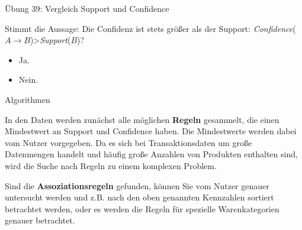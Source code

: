 \documentclass[12pt,ngerman,a4paper,ignorenonframetext,]{beamer}
\providecommand{\tightlist}{%
  \setlength{\itemsep}{0pt}\setlength{\parskip}{0pt}}
\begin{document}
\begin{frame}{Übung 39: Vergleich Support und Confidence}
\protect\hypertarget{ubung-39-vergleich-support-und-confidence}{}

Stimmt die Aussage: Die Confidenz ist stets größer als der Support:
\emph{Confidence}(\(A \rightarrow B\))\textgreater{}\emph{Support}(\(B\))?

\begin{itemize}
\tightlist
\item
  Ja.
\item
  Nein.
\end{itemize}


\end{frame}

\begin{frame}{Algorithmen}
\protect\hypertarget{algorithmen}{}

In den Daten werden zunächst alle möglichen \textbf{Regeln} gesammelt,
die einen Mindestwert an Support und Confidence haben. Die Mindestwerte
werden dabei vom Nutzer vorgegeben. Da es sich bei Transaktionsdaten um
große Datenmengen handelt und häufig große Anzahlen von Produkten
enthalten sind, wird die Suche nach Regeln zu einem komplexen Problem.

Sind die \textbf{Assoziationsregeln} gefunden, können Sie vom Nutzer
genauer untersucht werden und \mbox{z.\thinspace{}B.}\xspace{} nach den
oben genannten Kennzahlen sortiert betrachtet werden, oder es werden die
Regeln für spezielle Warenkategorien genauer betrachtet.

\end{frame}
\end{document}
